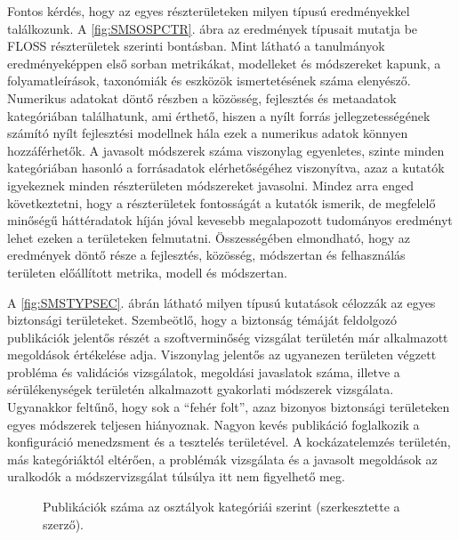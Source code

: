 \documentclass[12pt,magyar,a4paper,oneside]{scrreprt}
\begin{document}
Fontos kérdés, hogy az egyes részterületeken milyen típusú eredményekkel
találkozunk. A \ref{fig:SMSOSPCTR}. ábra az eredmények típusait mutatja
be FLOSS részterületek szerinti bontásban. Mint látható a tanulmányok
eredményeképpen első sorban metrikákat, modelleket és módszereket
kapunk, a folyamatleírások, taxonómiák és eszközök ismertetésének száma
elenyésző. Numerikus adatokat döntő részben a közösség, fejlesztés és
metaadatok kategóriában találhatunk, ami érthető, hiszen a nyílt forrás
jellegzetességének számító nyílt fejlesztési modellnek hála ezek a
numerikus adatok könnyen hozzáférhetők. A javasolt módszerek száma
viszonylag egyenletes, szinte minden kategóriában hasonló a forrásadatok
elérhetőségéhez viszonyítva, azaz a kutatók igyekeznek minden
részterületen módszereket javasolni. Mindez arra enged következtetni,
hogy a részterületek fontosságát a kutatók ismerik, de megfelelő
minőségű háttéradatok híján jóval kevesebb megalapozott tudományos
eredményt lehet ezeken a területeken felmutatni. Összességében
elmondható, hogy az eredmények döntő része a fejlesztés, közösség,
módszertan és felhasználás területen előállított metrika, modell és
módszertan.

A \ref{fig:SMSTYPSEC}. ábrán látható milyen típusú kutatások célozzák az
egyes biztonsági területeket. Szembeötlő, hogy a biztonság témáját
feldolgozó publikációk jelentős részét a szoftverminőség vizsgálat
területén már alkalmazott megoldások értékelése adja. Viszonylag
jelentős az ugyanezen területen végzett probléma és validációs
vizsgálatok, megoldási javaslatok száma, illetve a sérülékenységek
területén alkalmazott gyakorlati módszerek vizsgálata. Ugyanakkor
feltűnő, hogy sok a ``fehér folt'', azaz bizonyos biztonsági területeken
egyes módszerek teljesen hiányoznak. Nagyon kevés publikáció foglalkozik
a konfiguráció menedzsment és a tesztelés területével. A kockázatelemzés
területén, más kategóriáktól eltérően, a problémák vizsgálata és a
javasolt megoldások az uralkodók a módszervizsgálat túlsúlya itt nem
figyelhető meg.

\begin{figure}
\centering



\caption{Publikációk száma az osztályok kategóriái szerint
(szerkesztette a szerző).}

\label{fig:SMSCategs}

\end{figure}
\end{document}

